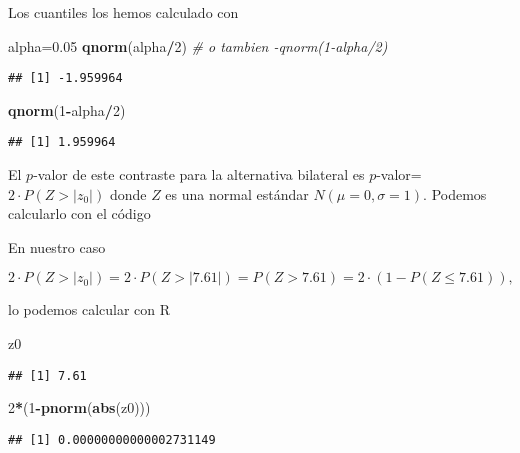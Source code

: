\documentclass[
]{article}
\newenvironment{Shaded}{\begin{snugshade}}{\end{snugshade}}
\newcommand{\CommentTok}[1]{\textcolor[rgb]{0.56,0.35,0.01}{\textit{#1}}}
\newcommand{\DecValTok}[1]{\textcolor[rgb]{0.00,0.00,0.81}{#1}}
\newcommand{\FloatTok}[1]{\textcolor[rgb]{0.00,0.00,0.81}{#1}}
\newcommand{\KeywordTok}[1]{\textcolor[rgb]{0.13,0.29,0.53}{\textbf{#1}}}
\newcommand{\NormalTok}[1]{#1}
\newcommand{\OperatorTok}[1]{\textcolor[rgb]{0.81,0.36,0.00}{\textbf{#1}}}
\begin{document}
Los cuantiles los hemos calculado con

\begin{Shaded}
\begin{Highlighting}[]
\NormalTok{alpha=}\FloatTok{0.05}
\KeywordTok{qnorm}\NormalTok{(alpha}\OperatorTok{/}\DecValTok{2}\NormalTok{) }\CommentTok{# o tambien -qnorm(1-alpha/2)}
\end{Highlighting}
\end{Shaded}

\begin{verbatim}
## [1] -1.959964
\end{verbatim}

\begin{Shaded}
\begin{Highlighting}[]
\KeywordTok{qnorm}\NormalTok{(}\DecValTok{1}\OperatorTok{-}\NormalTok{alpha}\OperatorTok{/}\DecValTok{2}\NormalTok{)}
\end{Highlighting}
\end{Shaded}

\begin{verbatim}
## [1] 1.959964
\end{verbatim}

El \(p\)-valor de este contraste para la alternativa bilateral es
\(p\)-valor=\(2\cdot P(Z>|z_0|)\) donde \(Z\) es una normal estándar
\(N(\mu=0,\sigma=1)\). Podemos calcularlo con el código

En nuestro caso

\[2\cdot P(Z>|z_0|)= 2\cdot P(Z>|7.61|)=P(Z>7.61)=2\cdot(1-P(Z\leq 7.61 )),\]

lo podemos calcular con R

\begin{Shaded}
\begin{Highlighting}[]
\NormalTok{z0}
\end{Highlighting}
\end{Shaded}

\begin{verbatim}
## [1] 7.61
\end{verbatim}

\begin{Shaded}
\begin{Highlighting}[]
\DecValTok{2}\OperatorTok{*}\NormalTok{(}\DecValTok{1}\OperatorTok{-}\KeywordTok{pnorm}\NormalTok{(}\KeywordTok{abs}\NormalTok{(z0)))}
\end{Highlighting}
\end{Shaded}

\begin{verbatim}
## [1] 0.00000000000002731149
\end{verbatim}
\end{document}
